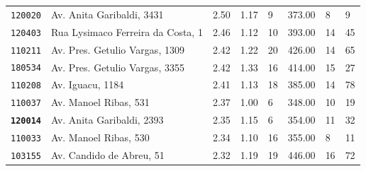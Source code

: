 \begin{table}[htb]
\begin{tabular} {p{1.5cm}p{4.0cm}p{1.5cm}p{1.5cm}p{1.5cm}p{1.5cm}p{1.5cm}p{1.5cm} }
    \texttt{120020} &                    Av. Anita Garibaldi, 3431  &              2.50 &                   1.17 &        9 &        373.00 &           8 &           9 \\
    \texttt{120403} &            Rua Lysimaco Ferreira da Costa, 1  &              2.46 &                   1.12 &       10 &        393.00 &          14 &          45 \\
    \texttt{110211} &               Av. Pres. Getulio Vargas, 1309  &              2.42 &                   1.22 &       20 &        426.00 &          14 &          65 \\
    \texttt{180534} &               Av. Pres. Getulio Vargas, 3355  &              2.42 &                   1.33 &       16 &        414.00 &          15 &          27 \\
    \texttt{110208} &                             Av. Iguacu, 1184  &              2.41 &                   1.13 &       18 &        385.00 &          14 &          78 \\
    \texttt{110037} &                        Av. Manoel Ribas, 531  &              2.37 &                   1.00 &        6 &        348.00 &          10 &          19 \\
    \textbf{\texttt{120014}} &                    Av. Anita Garibaldi, 2393  &              2.35 &                   1.15 &        6 &        354.00 &          11 &          32 \\
    \texttt{110033} &                        Av. Manoel Ribas, 530  &              2.34 &                   1.10 &       16 &        355.00 &           8 &          11 \\
    \texttt{103155} &                    Av. Candido de Abreu, 51   &              2.32 &                   1.19 &       19 &        446.00 &          16 &          72 \\
        \hline  
    \end{tabular}
\end{table}


    

